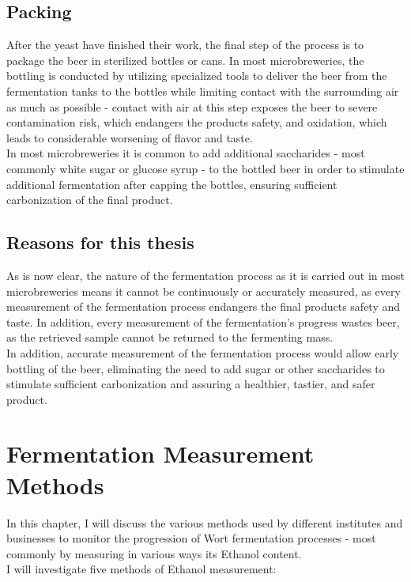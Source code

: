 \documentclass[twoside]{ctuthesis}
\theoremstyle{plain}
\theoremstyle{definition}
\theoremstyle{note}
\begin{document}
\section{Packing}
After the yeast have finished their work, the final step of the process is to package the beer in sterilized bottles or cans. In most microbreweries, the bottling is conducted by utilizing specialized tools to deliver the beer from the fermentation tanks to the bottles while limiting contact with the surrounding air as much as possible - contact with air at this step exposes the beer to severe contamination risk,  which endangers the products safety, and oxidation, which leads to considerable worsening of flavor and taste.\\
In most microbreweries it is common to add additional saccharides - most commonly white sugar or glucose syrup - to the bottled beer in order to stimulate additional fermentation after capping the bottles, ensuring sufficient carbonization of the final product.

\section{Reasons for this thesis}
As is now clear, the nature of the fermentation process as it is carried out in most microbreweries means it cannot be continuously or accurately measured, as every measurement of the fermentation process endangers the final products safety and taste. In addition, every measurement of the fermentation's progress wastes beer, as the retrieved sample cannot be returned to the fermenting mass.\\
In addition, accurate measurement of the fermentation process would allow early bottling of the beer, eliminating the need to add sugar or other saccharides to stimulate sufficient carbonization and assuring a healthier, tastier, and safer product.

\pagebreak

\begingroup
\renewcommand{\cleardoublepage}{}
\renewcommand{\clearpage}{}
\chapter{Fermentation Measurement Methods}
\endgroup

In this chapter, I will discuss the various methods used by different institutes and businesses to monitor the progression of Wort fermentation processes - most commonly by measuring in various ways its Ethanol content.\\
I will investigate five methods of Ethanol measurement:\\
\end{document}
